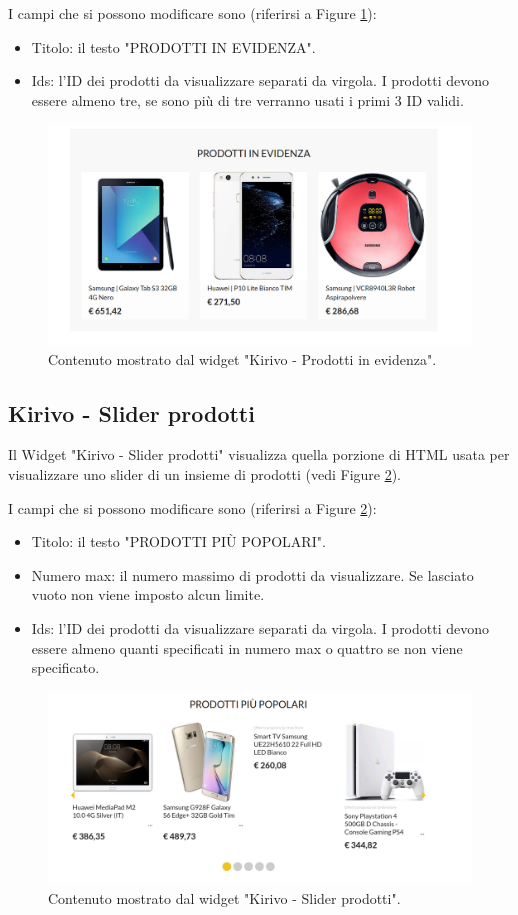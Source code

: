 I campi che si possono modificare sono (riferirsi a Figure \ref{fig:kevid}):
\begin{itemize}
\item Titolo: il testo "PRODOTTI IN EVIDENZA".
\item Ids: l'ID dei prodotti da visualizzare separati da virgola. I prodotti devono
essere almeno tre, se sono più di tre verranno usati i primi 3 ID validi.
\end{itemize}

\begin{figure}
  \includegraphics[width=\textwidth]{figure/kevid.png}
  \caption{Contenuto mostrato dal widget "Kirivo - Prodotti in evidenza".}
  \label{fig:kevid}
\end{figure}

\newpage
\subsection{Kirivo - Slider prodotti}


Il Widget "Kirivo - Slider prodotti"   visualizza quella porzione di HTML usata
per visualizzare uno slider di un insieme di prodotti (vedi Figure \ref{fig:kslide}).

I campi che si possono modificare sono (riferirsi a Figure \ref{fig:kslide}):
\begin{itemize}
\item Titolo: il testo "PRODOTTI PIÙ POPOLARI".
\item Numero max: il numero massimo di prodotti da visualizzare. Se lasciato vuoto non viene imposto alcun limite.
\item Ids: l'ID dei prodotti da visualizzare separati da virgola. I prodotti devono
essere almeno quanti specificati in numero max o quattro se non viene specificato.
\end{itemize}

\begin{figure}
  \includegraphics[width=\textwidth]{figure/kslide.png}
  \caption{Contenuto mostrato dal widget "Kirivo - Slider prodotti".}
  \label{fig:kslide}
\end{figure}

